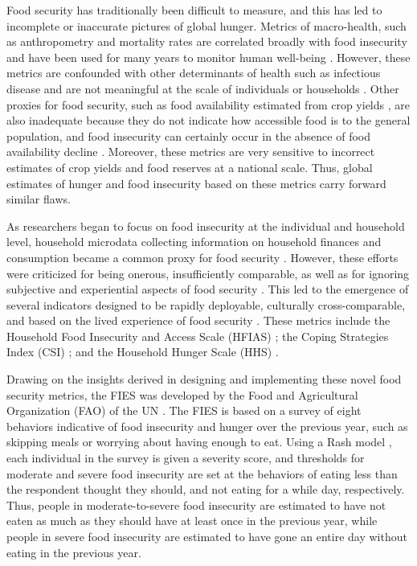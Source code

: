 \documentclass{article}
\begin{document}
Food security has traditionally been difficult to measure, and this has led to incomplete or inaccurate pictures of global hunger.  Metrics of macro-health, such as anthropometry and mortality rates are correlated broadly with food insecurity and have been used for many years to monitor human well-being \citep{Puffer1973, Habicht1974}.  However, these metrics are confounded with other determinants of health such as infectious disease and are not meaningful at the scale of individuals or households \citep{Perumal2018}.  Other proxies for food security, such as food availability estimated from crop yields \citep{Maxwell1992}, are also inadequate because they do not indicate how accessible food is to the general population, and food insecurity can certainly occur in the absence of food availability decline \citep{Sen1983}.  Moreover, these metrics are very sensitive to incorrect estimates of crop yields and food reserves at a national scale.  Thus, global estimates of hunger and food insecurity based on these metrics carry forward similar flaws.

As researchers began to focus on food insecurity at the individual and household level, household microdata collecting information on household finances and consumption became a common proxy for food security \citep{Haddad1994}.  However, these efforts were criticized for being onerous, insufficiently comparable, as well as for ignoring subjective and experiential aspects of food security \citep{Maxwell1996}.  This led to the emergence of several indicators designed to be rapidly deployable, culturally cross-comparable, and based on the lived experience of food security \citep{Jones2013}.  These metrics include the Household Food Insecurity and Access Scale (HFIAS) \citep{Coates2007}; the Coping Strategies Index (CSI) \citep{Maxwell1999}; and the Household Hunger Scale (HHS) \citep{Ballard2011}.

Drawing on the insights derived in designing and implementing these novel food security metrics, the FIES was developed by the Food and Agricultural Organization (FAO) of the UN \cite{Ballard2013}.  The FIES is based on a survey of eight behaviors indicative of food insecurity and hunger over the previous year, such as skipping meals or worrying about having enough to eat.  Using a Rash model \citep{Cafiero2018}, each individual in the survey is given a severity score, and thresholds for moderate and severe food insecurity are set at the behaviors of eating less than the respondent thought they should, and not eating for a while day, respectively.  Thus, people in moderate-to-severe food insecurity are estimated to have not eaten as much as they should have at least once in the previous year, while people in severe food insecurity are estimated to have gone an entire day without eating in the previous year.
\end{document}

